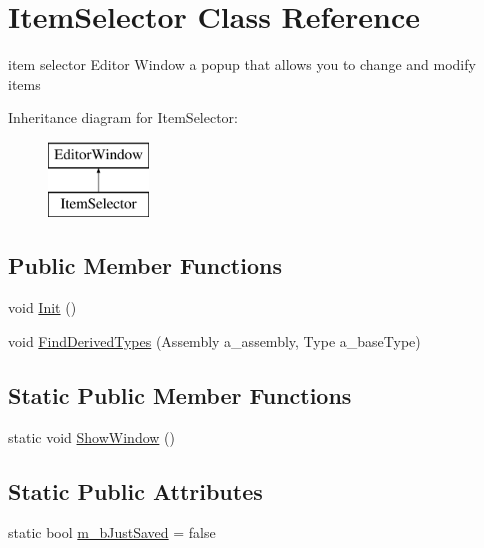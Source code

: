 \hypertarget{class_item_selector}{}\section{Item\+Selector Class Reference}
\label{class_item_selector}


item selector Editor Window a popup that allows you to change and modify items  


Inheritance diagram for Item\+Selector\+:\begin{figure}[H]
\begin{center}
\leavevmode
\includegraphics[height=2.000000cm]{class_item_selector}
\end{center}
\end{figure}
\subsection*{Public Member Functions}
\begin{DoxyCompactItemize}
\item 
void \mbox{\hyperlink{class_item_selector_a51e8782eaf95ac0477bf971f629647d2}{Init}} ()
\item 
void \mbox{\hyperlink{class_item_selector_a94d75921f097ad73cd36d55d0e309f5e}{Find\+Derived\+Types}} (Assembly a\+\_\+assembly, Type a\+\_\+base\+Type)
\end{DoxyCompactItemize}
\subsection*{Static Public Member Functions}
\begin{DoxyCompactItemize}
\item 
static void \mbox{\hyperlink{class_item_selector_a99398e8dcd0774a09cee6e1c7a452e76}{Show\+Window}} ()
\end{DoxyCompactItemize}
\subsection*{Static Public Attributes}
\begin{DoxyCompactItemize}
\item 
static bool \mbox{\hyperlink{class_item_selector_a657a76bb7b328dad50878398bd2b9dc7}{m\+\_\+b\+Just\+Saved}} = false
\end{DoxyCompactItemize}


